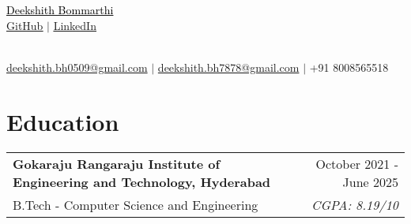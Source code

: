 \documentclass[a4paper,10pt]{article}
\newcommand{\sectionheader}[2]{%
    \begin{center}
        \textcolor{myblue}{\Huge #1} \\[6pt]
        \textcolor{mydarkblue}{\underline{\href{#2}{\raisebox{-0.05\height}{\faGithub} GitHub}} $|$}
        \textcolor{mydarkblue}{\underline{\href{https://www.linkedin.com/in/deekshith-bommarthi/}{\raisebox{-0.05\height}{\faLinkedin} LinkedIn}}}
    \end{center}
}
\newcommand{\sectionheader}[2]{%
    \begin{center}
        \vspace*{-\baselineskip} %
        \textcolor{myblue}{\Huge #1} \\[6pt]
        \vspace{-8pt} %
        \textcolor{mydarkblue}{\underline{\href{#2}{\raisebox{-0.05\height}{\faGithub} GitHub}} $|$}
        \textcolor{mydarkblue}{\underline{\href{https://www.linkedin.com/in/deekshith-bommarthi/}{\raisebox{-0.05\height}{\faLinkedin} LinkedIn}}}
    \end{center}
}
\begin{document}
\begin{center}
    \parbox{\linewidth}{%
        \centering
        \sectionheader{\href{https://deekshith0509.github.io/Portfolio.html}{\textcolor{black}{Deekshith Bommarthi}}}{https://github.com/deekshith0509/} \\[2pt]
        \textcolor{mydarkblue}{\raisebox{-0.05\height}{\faEnvelope} \href{mailto:deekshith.bh0509@gmail.com}{deekshith.bh0509@gmail.com}} $|$ 
        \textcolor{mydarkblue}{\href{mailto:deekshith.bh7878@gmail.com}{deekshith.bh7878@gmail.com}} $|$ 
        \textcolor{mydarkblue}{\raisebox{-0.05\height}{\faMobile} +91 8008565518} \\
    }
\end{center}


\section*{Education}
\vspace{5pt}

\begin{tabularx}{\linewidth}{@{} l r @{}}
    \color{myblue} \textbf{Gokaraju Rangaraju Institute of Engineering and Technology, Hyderabad} & \hspace{3.5cm}  \color{mydarkblue} October 2021 - June 2025 \\[1pt] %
    \color{mydarkblue} B.Tech - Computer Science and Engineering &  \vspace{-10pt}\color{mylightpurple} \textit{CGPA: 8.19/10} \\[10pt] %

\end{tabularx}


\newcommand{\skillsentry}[2]{%
    \textcolor{myblue}{\textbf{#1}} & \textcolor{mydarkblue}{#2} \\
}
\newcommand{\skillsentry}[2]{%
    \textcolor{myblue}{\textbf{#1}} & \textcolor{mydarkblue}{#2} \\
}
\vspace{-3pt}
\end{document}
